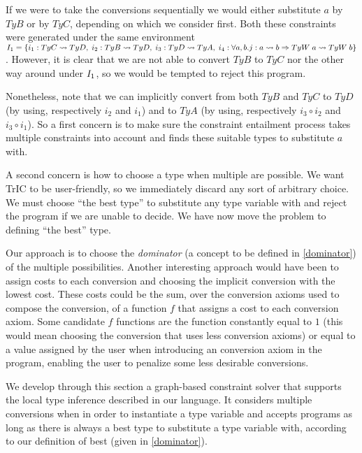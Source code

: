 If we were to take the conversions sequentially we would either substitute $a$ by $TyB$ or by $TyC$, depending on which we consider first. Both these constraints were generated under the same environment $I_1 = \{i_1 : TyC \rightsquigarrow TyD, \;i_2 : TyB \rightsquigarrow TyD,\; i_3 : TyD \rightsquigarrow TyA,\;i_4 :\forall a, b . j : a \rightsquigarrow b \Rightarrow TyW\;a\rightsquigarrow TyW\;b\}$. However, it is clear that we are not able to convert $TyB$ to $TyC$ nor the other way around under $I_1$, so we would be tempted to reject this program.

Nonetheless, note that we can implicitly convert from both $TyB$ and $TyC$ to $TyD$ (by using, respectively $i_2$ and $i_1$) and to $TyA$ (by using, respectively $i_3 \circ i_2$ and $i_3 \circ i_1$). So a first concern is to make sure the constraint entailment process takes multiple constraints into account and finds these suitable types to substitute $a$ with.

A second concern is how to choose a type when multiple are possible. We want TrIC to be user-friendly, so we immediately discard any sort of arbitrary choice. We must choose ``the best type'' to substitute any type variable with and reject the program if we are unable to decide. We have now move the problem to defining ``the best'' type.

Our approach is to choose the \textit{dominator} (a concept to be defined in \ref{dominator}) of the multiple possibilities. Another interesting approach would have been to assign costs to each conversion and choosing the implicit conversion with the lowest cost. These costs could be the sum, over the conversion axioms used to compose the conversion, of a function $f$ that assigns a cost to each conversion axiom. Some candidate $f$ functions are the function constantly equal to $1$ (this would mean choosing the conversion that uses less conversion axioms) or equal to a value assigned by the user when introducing an conversion axiom in the program, enabling the user to penalize some less desirable conversions.

We develop through this section a graph-based constraint solver that supports the local type inference described in our language. It considers multiple conversions when in order to instantiate a type variable and accepts programs as long as there is always a best type to substitute a type variable with, according to our definition of best (given in \ref{dominator}).

